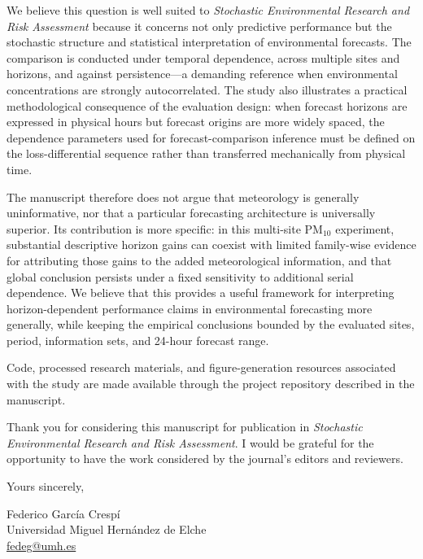 \documentclass[9pt,a4paper]{article}
\begin{document}
We believe this question is well suited to
\textit{Stochastic Environmental Research and Risk Assessment} because it
concerns not only predictive performance but the stochastic structure and
statistical interpretation of environmental forecasts. The comparison is
conducted under temporal dependence, across multiple sites and horizons, and
against persistence---a demanding reference when environmental concentrations
are strongly autocorrelated. The study also illustrates a practical
methodological consequence of the evaluation design: when forecast horizons
are expressed in physical hours but forecast origins are more widely spaced,
the dependence parameters used for forecast-comparison inference must be
defined on the loss-differential sequence rather than transferred mechanically
from physical time.

The manuscript therefore does not argue that meteorology is generally
uninformative, nor that a particular forecasting architecture is universally
superior. Its contribution is more specific: in this multi-site PM$_{10}$
experiment, substantial descriptive horizon gains can coexist with limited
family-wise evidence for attributing those gains to the added meteorological
information, and that global conclusion persists under a fixed sensitivity to
additional serial dependence. We believe that this provides a useful framework
for interpreting horizon-dependent performance claims in environmental
forecasting more generally, while keeping the empirical conclusions bounded by
the evaluated sites, period, information sets, and 24-hour forecast range.

Code, processed research materials, and figure-generation resources associated
with the study are made available through the project repository described in
the manuscript.

Thank you for considering this manuscript for publication in
\textit{Stochastic Environmental Research and Risk Assessment}. I would be
grateful for the opportunity to have the work considered by the journal's
editors and reviewers.

Yours sincerely,

\vspace{6pt}

\noindent
Federico García Crespí\\
Universidad Miguel Hernández de Elche\\
\href{mailto:fedeg@umh.es}{fedeg@umh.es}
\end{document}
